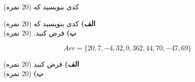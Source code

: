 \begin{prob}
	کدی بنویسید که (20 نمره)

\end{prob}

\begin{prob}
	\textbf{الف)}
	کدی بنویسید که  (20 نمره)
	\\\textbf{ب)}
	فرض کنید. (20 نمره)

	$$Arr = \{20, 7, -4, 32, 0, 362, 44, 70, -47, 69\}$$


\end{prob}

\begin{prob}
	\textbf{الف)}
	فرض کنید  (20 نمره)
	\\\textbf{ب)}
	(20 نمره)


\end{prob}







